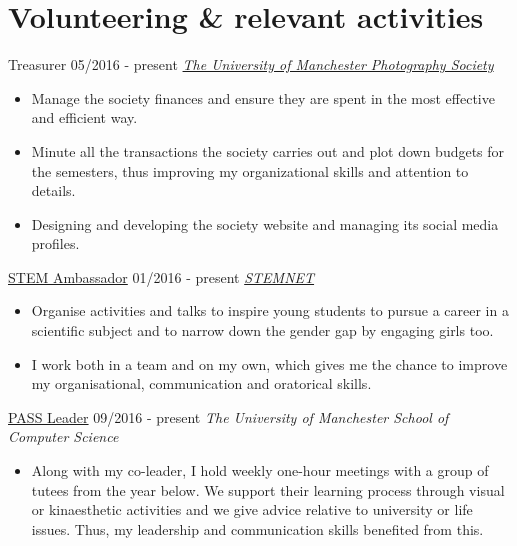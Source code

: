 \documentclass[]{friggeri-cv}
\begin{document}

\section{\color{red}Volunteering \color{gray} \& relevant activities}
\begin{entrylist}
  \entry
    {}
    {Treasurer}
    {05/2016 - present}
    {\emph{\href{https://www.facebook.com/UoMPhotoSoc/}{The University of Manchester Photography Society}}}
    \begin{itemize}
        \item Manage the society finances and ensure they are spent in the most effective and efficient way.
        \item Minute all the transactions the society carries out and plot down budgets for the semesters, thus improving my organizational skills and attention to details.
        \item Designing and developing the society website and managing its social media profiles. \\
    \end{itemize}
  \entry
    {}
    {\href{http://www.stemnet.org.uk/ambassadors/}{STEM Ambassador}}
    {01/2016 - present}
    {\emph{\href{http://www.stemnet.org.uk/}{STEMNET}}}
    \begin{itemize}
        \item Organise activities and talks to inspire young students to pursue a career in a scientific subject and to narrow down the gender gap by engaging girls too.
        \item I work both in a team and on my own, which gives me the chance to improve my organisational, communication and oratorical skills.\\
    \end{itemize}
  \entry
    {}
    {\href{http://www.pass.manchester.ac.uk/}{PASS Leader}}
    {09/2016 - present}
    {\emph{The University of Manchester School of Computer Science}}
    \begin{itemize}
        \item Along with my co-leader, I hold weekly one-hour meetings with a group of tutees from the year below. We support their learning process through visual or kinaesthetic activities and we give advice relative to university or life issues. Thus, my leadership and communication skills benefited from this.\\
    \end{itemize}
  \entry

\end{entrylist}
\end{document}
